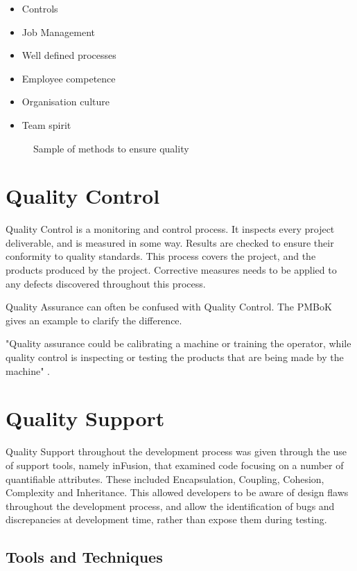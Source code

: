 \begin{itemize}
\item Controls
\item Job Management
\item Well defined processes
\item Employee competence
\item Organisation culture
\item Team spirit
\end{itemize}
\begin{figure}[H]
\caption{Sample of methods to ensure quality}
\label{fig:qstandards}
\end{figure}

\section{Quality Control}

Quality Control is a monitoring and control process. It inspects every project deliverable, and is measured in some way. Results are checked to ensure their conformity to quality standards. This process covers the project, and the products produced by the project. Corrective measures needs to be applied to any defects discovered throughout this process.

Quality Assurance can often be confused with Quality Control. The PMBoK gives an example to clarify the difference.

"Quality assurance could be calibrating a machine or training the operator, while quality control is inspecting or testing the products that are being made by the machine" \parencite{pmbok}.

\section{Quality Support}

Quality Support throughout the development process was given through the use of support tools, namely inFusion, that examined code focusing on a number of quantifiable attributes. These included Encapsulation, Coupling, Cohesion, Complexity and Inheritance. This allowed developers to be aware of design flaws throughout the development process, and allow the identification of bugs and discrepancies at development time, rather than expose them during testing. 

\subsection{Tools and Techniques}

